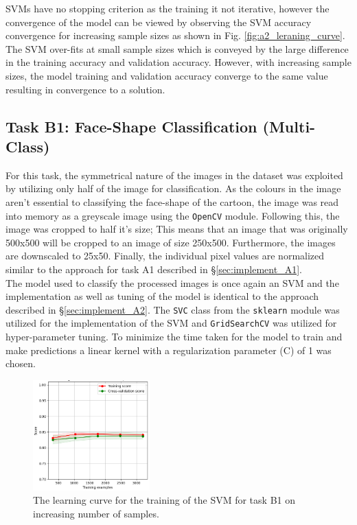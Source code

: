 \documentclass{article}
\begin{document}
 		SVMs have no stopping criterion as the training it not iterative, however the convergence of the model can be viewed by observing the SVM accuracy convergence for increasing sample sizes as shown in Fig. \ref{fig:a2_leraning_curve}. The SVM over-fits at small sample sizes which is conveyed by the large difference in the training accuracy and validation accuracy. However, with increasing sample sizes, the model training and validation accuracy converge to the same value resulting in convergence to a solution.
 		
    \subsection{Task B1: Face-Shape Classification (Multi-Class)}
    \label{sec:implement_B1}
	    
	    For this task, the symmetrical nature of the images in the dataset was exploited by utilizing only half of the image for classification. As the colours in the image aren't essential to classifying the face-shape of the cartoon, the image was read into memory as a greyscale image using the {\tt OpenCV} module. Following this, the image was cropped to half it's size; This means that an image that was originally 500x500 will be cropped to an image of size 250x500. Furthermore, the images are downscaled to 25x50. Finally, the individual pixel values are normalized similar to the approach for task A1 described in \S \ref{sec:implement_A1}. 
	    \\
	    
	    The model used to classify the processed images is once again an SVM and the implementation as well as tuning of the model is identical to the approach described in \S \ref{sec:implement_A2}. The {\tt SVC} class from the {\tt sklearn} module was utilized for the implementation of the SVM and {\tt GridSearchCV} was utilized for hyper-parameter tuning. To minimize the time taken for the model to train and make predictions a linear kernel with a regularization parameter (C) of 1 was chosen. 
	    \\
	    
	    \begin{figure}[htb]
	    	\centering
	    	\includegraphics[width=0.4\textwidth]{b1_learning_curve.png}
	    	\caption{The learning curve for the training of the SVM for task B1 on increasing number of samples.}
	    	\label{fig:b1_leraning_curve}
	    \end{figure}
	    
\end{document}
